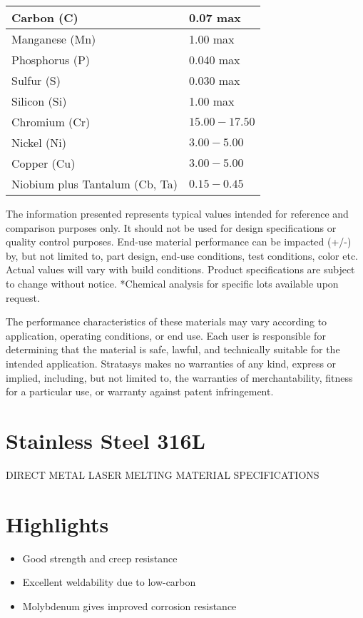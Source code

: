 \documentclass[10pt]{article}
\begin{document}
\begin{center}
\begin{tabular}{|l|l|}
\hline
Carbon (C) & 0.07 max \\
\hline
Manganese (Mn) & 1.00 max \\
\hline
Phosphorus (P) & 0.040 max \\
\hline
Sulfur (S) & 0.030 max \\
\hline
Silicon (Si) & 1.00 max \\
\hline
Chromium (Cr) & $15.00-17.50$ \\
\hline
Nickel (Ni) & $3.00-5.00$ \\
\hline
Copper (Cu) & $3.00-5.00$ \\
\hline
Niobium plus Tantalum (Cb, Ta) & $0.15-0.45$ \\
\hline
\end{tabular}
\end{center}

The information presented represents typical values intended for reference and comparison purposes only. It should not be used for design specifications or quality control purposes. End-use material performance can be impacted (+/-) by, but not limited to, part design, end-use conditions, test conditions, color etc. Actual values will vary with build conditions. Product specifications are subject to change without notice. *Chemical analysis for specific lots available upon request.

The performance characteristics of these materials may vary according to application, operating conditions, or end use. Each user is responsible for determining that the material is safe, lawful, and technically suitable for the intended application. Stratasys makes no warranties of any kind, express or implied, including, but not limited to, the warranties of merchantability, fitness for a particular use, or warranty against patent infringement.

\section*{Stainless Steel 316L}
DIRECT METAL LASER MELTING MATERIAL SPECIFICATIONS

\section*{Highlights}
\begin{itemize}
  \item Good strength and creep resistance

  \item Excellent weldability due to low-carbon

  \item Molybdenum gives improved corrosion resistance

\end{itemize}
\end{document}
